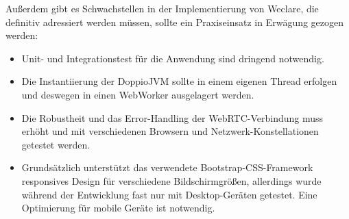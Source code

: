 Außerdem gibt es Schwachstellen in der Implementierung von Weclare, die definitiv adressiert werden müssen, sollte ein Praxiseinsatz in Erwägung gezogen werden:
\begin{itemize}
    \item Unit- und Integrationstest für die Anwendung sind dringend notwendig.
    \item Die Instantiierung der DoppioJVM sollte in einem eigenen Thread erfolgen und deswegen in einen WebWorker ausgelagert werden.
    \item Die Robustheit und das Error-Handling der WebRTC-Verbindung muss erhöht und mit verschiedenen Browsern und Netzwerk-Konstellationen getestet werden.
    \item Grundsätzlich unterstützt das verwendete Bootstrap-CSS-Framework responsives Design für verschiedene Bildschirmgrößen, allerdings wurde während der Entwicklung fast nur mit Desktop-Geräten getestet. Eine Optimierung für mobile Geräte ist notwendig.
\end{itemize}




